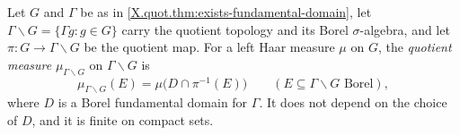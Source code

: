 Let $G$ and $\Gamma$ be as in \cref{X.quot.thm:exists-fundamental-domain}, let $\Gamma\backslash G=\{\Gamma g:g\in G\}$
carry the quotient topology and its Borel $\sigma$-algebra, and let $\pi\colon G\to\Gamma\backslash G$ be the quotient
map. For a left Haar measure $\mu$ on $G$, the \emph{quotient measure} $\mu_{\Gamma\backslash G}$ on $\Gamma\backslash G$
is
\[
  \mu_{\Gamma\backslash G}(E)=\mu\bigl(D\cap\pi^{-1}(E)\bigr)\qquad(E\subseteq\Gamma\backslash G\text{ Borel}),
\]
where $D$ is a Borel fundamental domain for $\Gamma$. It does not depend on the choice of $D$, and it is finite on
compact sets.
